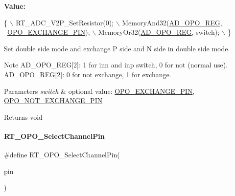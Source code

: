 {\bfseries Value\+:}
\begin{DoxyCode}
\{                                                   \(\backslash\)
        RT\_ADC\_V2P\_SetResistor(0);                      \(\backslash\)
        MemoryAnd32(\mbox{\hyperlink{a00020_aeca2931f15b40d772a94a66e4641619e}{AD\_OPO\_REG}}, ~\mbox{\hyperlink{a00002_af0663f5e9fee7a904ad95d1a4ecdaebda8866b250a87989e76add11875358e4ae}{OPO\_EXCHANGE\_PIN}});     \(\backslash\)
        MemoryOr32(\mbox{\hyperlink{a00020_aeca2931f15b40d772a94a66e4641619e}{AD\_OPO\_REG}}, \textcolor{keywordflow}{switch});                 \(\backslash\)
    \}
\end{DoxyCode}


Set double side mode and exchange P side and N side in double side mode. 

\begin{DoxyNote}{Note}
A\+D\+\_\+\+O\+P\+O\+\_\+\+R\+EG\mbox{[}2\mbox{]}\+: 1 for inn and inp switch, 0 for not (normal use). A\+D\+\_\+\+O\+P\+O\+\_\+\+R\+EG\mbox{[}2\mbox{]}\+: 0 for not exchange, 1 for exchange. 
\end{DoxyNote}

\begin{DoxyParams}{Parameters}
{\em switch} & optional value\+: \mbox{\hyperlink{a00002_af0663f5e9fee7a904ad95d1a4ecdaebda8866b250a87989e76add11875358e4ae}{O\+P\+O\+\_\+\+E\+X\+C\+H\+A\+N\+G\+E\+\_\+\+P\+IN}}, \mbox{\hyperlink{a00002_af0663f5e9fee7a904ad95d1a4ecdaebda4c251187b10da59c8696dbf4951b49d3}{O\+P\+O\+\_\+\+N\+O\+T\+\_\+\+E\+X\+C\+H\+A\+N\+G\+E\+\_\+\+P\+IN}} \\
\hline
\end{DoxyParams}
\begin{DoxyReturn}{Returns}
void 
\end{DoxyReturn}
\mbox{\label{a00002_aaa7081959e37104e40e3f637d42d5144}} 
\paragraph{\texorpdfstring{R\+T\+\_\+\+O\+P\+O\+\_\+\+Select\+Channel\+Pin}{RT\_OPO\_SelectChannelPin}}
{\footnotesize\ttfamily \#define R\+T\+\_\+\+O\+P\+O\+\_\+\+Select\+Channel\+Pin(\begin{DoxyParamCaption}\item[{}]{pin }\end{DoxyParamCaption})}

